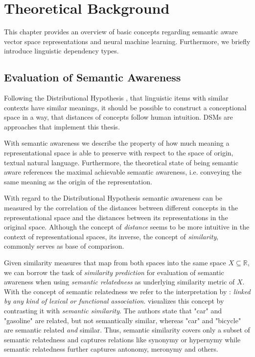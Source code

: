 \section{Theoretical Background}

This chapter provides an overview of basic concepts regarding semantic aware vector space representations and neural machine learning. Furthermore, we briefly introduce linguistic dependency types.

\subsection{Evaluation of Semantic Awareness} \label{subsec:eval_semantic_awareness}
Following the Distributional Hypothesis \autocite{harris_distributional_1954}, that linguistic items with similar contexts have similar meanings, it should be possible to construct a conceptional space in a way, that distances of concepts follow human intuition.
\acfp{DSM} \autocite{landauer_solution_1997,schutze_automatic_1998} are approaches that implement this thesis.

With semantic awareness we describe the property of how much meaning a representational space is able to preserve with respect to the space of origin, textual natural language. Furthermore, the theoretical state of being semantic aware references the maximal achievable semantic awareness, i.e. conveying the same meaning as the origin of the representation.

With regard to the Distributional Hypothesis semantic awareness can be measured by the correlation of the distances between different concepts in the representational space and the distances between its representations in the original space. Although the concept of \textit{distance} seems to be more intuitive in the context of representational spaces, its inverse, the concept of \textit{similarity}, commonly serves as base of comparison.  

Given similarity measures that map from both spaces into the same space $X \subseteq \mathbb{R}$, we can borrow the task of \textit{similarity prediction} for evaluation of semantic awareness when using \textit{semantic relatedness} as underlying similarity metric of $X$. With the concept of semantic relatedness we refer to the interpretation by \textcite{budanitsky_evaluating_2006}: \textit{linked by any kind of lexical or functional association}. \textcite{resnik_semantic_1999} visualizes this concept by contrasting it with \textit{semantic similarity}. The authors state that "car" and "gasoline" are related, but not semantically similar, whereas "car" and "bicycle" are semantic related \textit{and} similar. Thus, semantic similarity covers only a subset of semantic relatedness and captures relations like synonymy or hypernymy while semantic relatedness further captures antonomy, meronymy and others.

